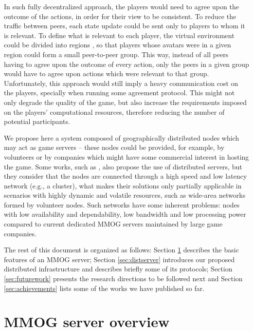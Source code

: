 \documentclass[]{usiinfprospectus}
\begin{document}
In such fully decentralized approach, the players would need to agree upon the outcome of the actions, in order for their view to be consistent. To reduce the traffic between peers, each state update could be sent only to players to whom it is relevant. To define what is relevant to each player, the virtual environment could be divided into regions \cite{schiele2007rpp}, so that players whose avatars were in a given region could form a small peer-to-peer group. This way, instead of all peers having to agree upon the outcome of every action, only the peers in a given group would have to agree upon actions which were relevant to that group. Unfortunately, this approach would still imply a heavy communication cost on the players, specially when running some agreement protocol. This might not only degrade the quality of the game, but also increase the requirements imposed on the players' computational resources, therefore reducing the number of potential participants.

We propose here a system composed of geographically distributed nodes which may act as game servers -- these nodes could be provided, for example, by volunteers or by companies which might have some commercial interest in hosting the game. Some works, such as \cite{assiotis2006dam, ng2002msa, chertov2006olb, lee2003sdl}, also propose the use of distributed servers, but they consider that the nodes are connected through a high speed and low latency network (e.g., a cluster), what makes their solutions only partially applicable in scenarios with highly dynamic and volatile resources, such as wide-area networks formed by volunteer nodes. Such networks have some inherent problems: nodes with low availability and dependability, low bandwidth and low processing power compared to current dedicated MMOG servers maintained by large game companies.

The rest of this document is organized as follows: Section \ref{sec:mmogserver} describes the basic features of an MMOG server; Section \ref{sec:distserver} introduces our proposed distributed infrastructure and describes briefly some of its protocols; Section \ref{sec:futurework} presents the research directions to be followed next and Section \ref{sec:achievements} lists some of the works we have published so far.

\section{MMOG server overview} \label{sec:mmogserver}
\end{document}
